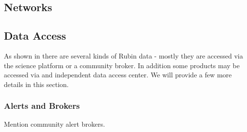 \subsection{Networks} \label{sec:network}

\subsection{Data Access} \label{sec:dataaccess}

As shown in  there are several kinds of Rubin data - mostly they are accessed via
the science platform or a community broker.
In addition some products may be accessed via and independent data access center. We will provide a few more details in this section.

\subsubsection{Alerts and Brokers}
Mention community alert brokers.
